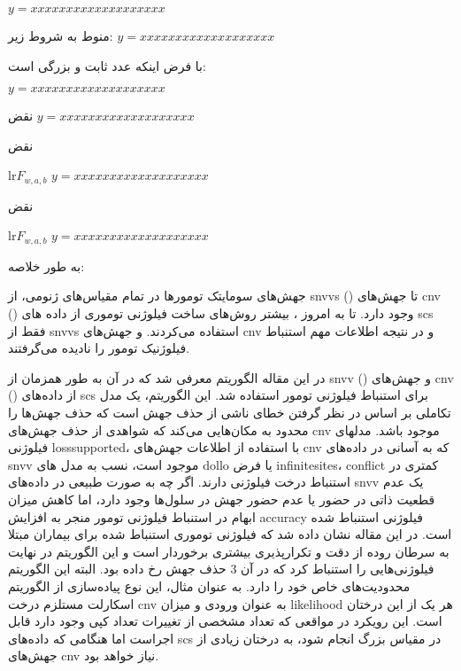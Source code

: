 \begin{math}
	y=xxxxxxxxxxxxxxxxxxx
\end{math}


منوط به شروط زیر: 
\begin{math}
	y=xxxxxxxxxxxxxxxxxxx
\end{math}


با فرض اینکه  عدد ثابت و بزرگی است: 

\begin{math}
	y=xxxxxxxxxxxxxxxxxxx
\end{math}


نقض 
\begin{math}
	y=xxxxxxxxxxxxxxxxxxx
\end{math}


نقض 

lr{$F_{w,a,b}$}
\begin{math}
	y=xxxxxxxxxxxxxxxxxxx
\end{math}


نقض 

lr{$F_{w,a,b}$}
\begin{math}
	y=xxxxxxxxxxxxxxxxxxx
\end{math}


به طور خلاصه: 

جهش‌های سومایتک تومورها در تمام مقیاس‌های ژنومی، از  \glspl{snvv} () تا جهش‌های \gls{cnv} () وجود دارد. تا به امروز ، بیشتر روش‌های ساخت فیلوژنی توموری از داده های \gls{scs}  فقط از  \glspl{snvv} استفاده می‌کردند.  \cite{singer2018single, malikic2015clonality, mcpherson2016divergent, el2018sphyr}  و جهش‌های \gls{cnv} و در نتیجه اطلاعات مهم استنباط فیلوژنیک تومور را نادیده می‌گرفتند. 
 
 در این مقاله الگوریتم  معرفی شد که در آن به طور همزمان از \gls{snvv} () و جهش‌های \gls{cnv} () از داده‌های \gls{scs} برای استنباط فیلوژنی تومور استفاده شد. این الگوریتم، یک مدل تکاملی بر اساس در نظر گرفتن خطای ناشی از حذف جهش است که حذف جهش‌ها را محدود به مکان‌هایی می‌کند که شواهدی از حذف جهش‌های \gls{cnv} موجود باشد. مدلهای فیلوژنی \gls{losssupported}،  با استفاده از اطلاعات جهش‌های \gls{cnv} که به آسانی در داده‌های \gls{snvv} موجود است، نسب به مدل های \gls{dollo} یا فرض \gls{infinitesites}، \gls{conflict} کمتری در استنباط درخت فیلوژنی دارند. اگر چه به صورت طبیعی در داده‌های \gls{snvv} یک عدم قطعیت ذاتی در حضور یا عدم حضور جهش در سلول‌ها وجود دارد، اما کاهش میزان ابهام در استنباط فیلوژنی تومور منجر به افزایش \gls{accuracy} فیلوژنی استنباط شده است. در این مقاله نشان داده شد که فیلوژنی توموری استنباط شده برای بیماران مبتلا به سرطان روده از دقت و تکرارپذیری بیشتری برخوردار است و این الگوریتم در نهایت فیلوژنی‌هایی را استنباط کرد که در آن 3 حذف جهش رخ داده بود. البته این الگوریتم محدودیت‌های خاص خود را دارد. به عنوان مثال، این نوع پیاده‌سازی از الگوریتم اسکارلت مستلزم درخت \gls{cnv} به عنوان ورودی و میزان \gls{likelihood} هر یک از این درختان است. این رویکرد در مواقعی که تعداد مشخصی از تغییرات تعداد کپی وجود دارد قابل اجراست اما هنگامی که داده‌های \gls{scs} در مقیاس بزرگ انجام شود، به درختان زیادی از جهش‌های \gls{cnv} نیاز خواهد بود. 



